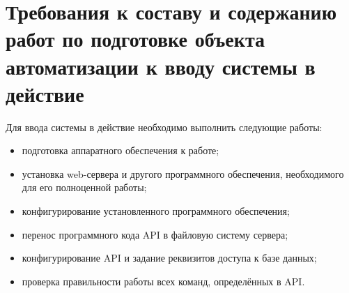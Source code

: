 \chapter{Требования к составу и содержанию работ по подготовке объекта автоматизации к вводу системы в действие}

\par
	Для ввода системы в действие необходимо выполнить следующие работы:

	\begin{itemize}
		\item подготовка аппаратного обеспечения к работе;
		\item установка web-сервера и другого программного обеспечения, необходимого для его полноценной работы;
		\item конфигурирование установленного программного обеспечения;
		\item перенос программного кода API в файловую систему сервера;
		\item конфигурирование API и задание реквизитов доступа к базе данных;
		\item проверка правильности работы всех команд, определённых в API.
	\end{itemize}
